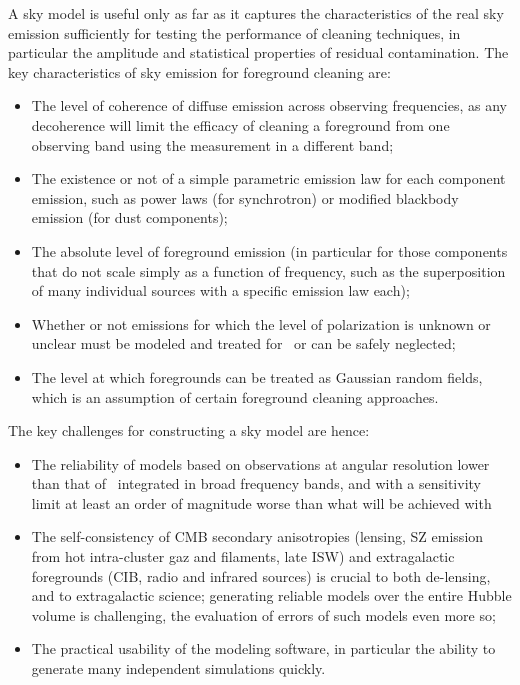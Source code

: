 A sky model is useful only as far as it captures the characteristics of the real sky emission sufficiently for testing the performance of cleaning techniques, in particular the amplitude and statistical properties of residual contamination.
The key characteristics of sky emission for foreground cleaning are:
\begin{itemize}
\item The level of coherence of diffuse emission across observing frequencies, as any decoherence will limit the efficacy of cleaning a foreground from one observing band using the measurement in a different band;
\item The existence or not of a simple parametric emission law for each component emission, such as power laws (for synchrotron) or modified blackbody emission (for dust components);
\item The absolute level of foreground emission (in particular for those components that do not scale simply as a function of frequency, such as the superposition of many individual sources with a specific emission law each);
\item Whether or not emissions for which the level of polarization is unknown or unclear 
must be modeled and treated for \cmbexp\ or can be safely neglected;
\item The level at which foregrounds can be treated as Gaussian random fields, which is an assumption of certain foreground cleaning approaches.
\end{itemize} 


The key challenges for constructing a sky model are hence:
\begin{itemize} 
\item The reliability of models based on observations at angular resolution lower than that of \cmbexp\, integrated in broad frequency bands, and with a sensitivity limit at least an order of magnitude worse than what will be achieved with \cmbexp\;
\item The self-consistency of CMB secondary anisotropies (lensing, SZ emission from hot intra-cluster gaz and filaments, late ISW) and extragalactic foregrounds (CIB, radio and infrared sources) is crucial to both de-lensing, and to extragalactic science; generating reliable models over the entire Hubble volume is challenging, the evaluation of errors of such models even more so;
\item The practical usability of the modeling software, in particular the ability to generate many independent simulations quickly.
\end{itemize} 

